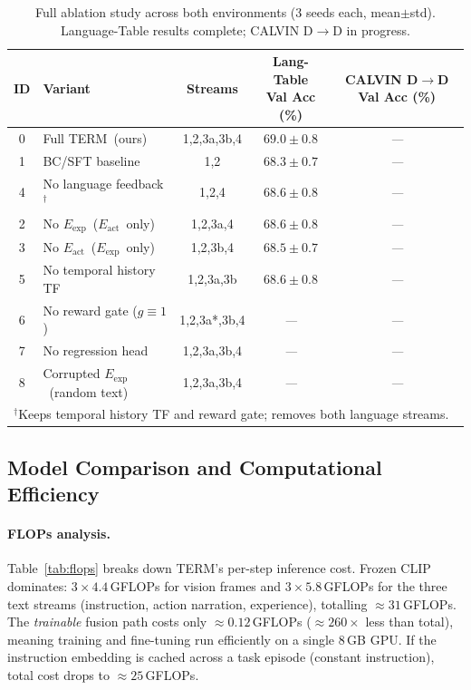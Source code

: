 \documentclass{article}
\newcommand{\modelname}{\textsc{TERM}\xspace}
\newcommand{\Lact}{$E_{\mathrm{act}}$\xspace}
\newcommand{\Lexp}{$E_{\mathrm{exp}}$\xspace}
\newcommand{\tbd}{\textit{---}\xspace}
\begin{document}
\begin{table}[h]
\centering
\caption{Full ablation study across both environments (3 seeds each, mean$\pm$std).
  Language-Table results complete; CALVIN D$\to$D in progress.}
\label{tab:ablations}
\small
\setlength{\tabcolsep}{4pt}
\begin{tabular}{clccc}
\toprule
\textbf{ID} & \textbf{Variant} & \textbf{Streams}
            & \makecell{Lang-Table\\Val Acc (\%)}
            & \makecell{CALVIN D$\to$D\\Val Acc (\%)} \\
\midrule
0  & Full \modelname\ (ours)              & 1,2,3a,3b,4  & $\mathbf{69.0\pm0.8}$ & \tbd \\
1  & BC/SFT baseline                      & 1,2          & $68.3\pm0.7$          & \tbd \\
4  & No language feedback$^\dagger$       & 1,2,4        & $68.6\pm0.8$          & \tbd \\
2  & No \Lexp\ (\Lact\ only)             & 1,2,3a,4     & $68.6\pm0.8$          & \tbd \\
3  & No \Lact\ (\Lexp\ only)             & 1,2,3b,4     & $68.5\pm0.7$          & \tbd \\
5  & No temporal history TF               & 1,2,3a,3b    & $68.6\pm0.8$          & \tbd \\
6  & No reward gate ($g\!\equiv\!1$)      & 1,2,3a*,3b,4 & \tbd                  & \tbd \\
7  & No regression head                   & 1,2,3a,3b,4  & \tbd                  & \tbd \\
8  & Corrupted \Lexp\ (random text)       & 1,2,3a,3b,4  & \tbd                  & \tbd \\
\bottomrule
\multicolumn{5}{l}{\footnotesize $^\dagger$Keeps temporal history TF and reward gate; removes both language streams.}\\
\end{tabular}
\end{table}

\subsection{Model Comparison and Computational Efficiency}
\label{sec:comparison}

\paragraph{FLOPs analysis.}
Table~\ref{tab:flops} breaks down TERM's per-step inference cost.
Frozen CLIP dominates: $3 \times 4.4$\,GFLOPs for vision frames
and $3 \times 5.8$\,GFLOPs for the three text streams
(instruction, action narration, experience), totalling $\approx\!31$\,GFLOPs.
The \emph{trainable} fusion path costs only $\approx\!0.12$\,GFLOPs
(${\approx}260\times$ less than total), meaning training
and fine-tuning run efficiently on a single 8\,GB GPU.
If the instruction embedding is cached across a task episode (constant instruction),
total cost drops to $\approx\!25$\,GFLOPs.
\end{document}
